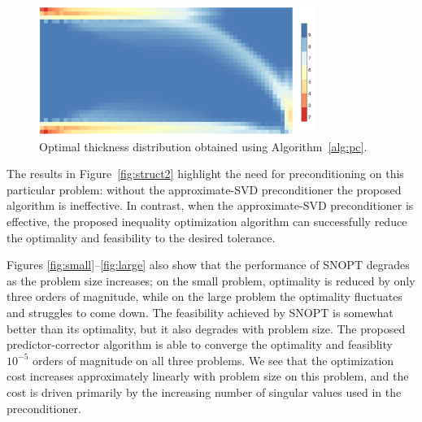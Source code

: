 \begin{figure}[tbp]
  \begin{center}
    \includegraphics*[clip,width=0.8\textwidth]{./figs/newres2/medium_thickness_color.pdf}%
    \caption{Optimal thickness distribution obtained using Algorithm~\ref{alg:pc}.
      \label{fig:thick}}
  \end{center}
\end{figure}  %

The results in Figure~\ref{fig:struct2} highlight the need for preconditioning
on this particular problem: without the approximate-SVD preconditioner the
proposed algorithm is ineffective. 
In contrast, when the approximate-SVD preconditioner is effective, the
proposed inequality optimization algorithm can successfully reduce the optimality 
and feasibility to the desired tolerance.

Figures \ref{fig:small}--\ref{fig:large} also show that the performance of SNOPT
degrades as the problem size increases; on the small problem, optimality is
reduced by only three orders of magnitude, while on the large problem the optimality
fluctuates and struggles to come down.  The feasibility achieved by SNOPT is somewhat better
than its optimality, but it also degrades with problem size.  The proposed
predictor-corrector algorithm is able to converge the optimality and feasiblity
$10^{-5}$ orders of magnitude on all three problems. We see that the
optimization cost increases approximately linearly with problem size on this
problem, and the cost is driven primarily by the increasing number of singular values used
in the preconditioner. 

